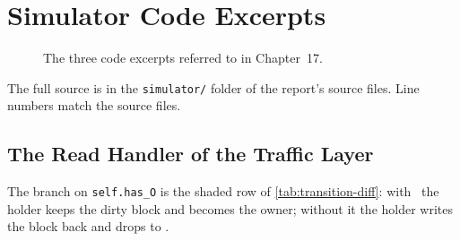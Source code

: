 \chapter{Simulator Code Excerpts}
\label{app:code}

\begin{figure}[htbp]
\centering
{}
\caption[]{The three code excerpts referred to in
Chapter~17.}
\label{fig:app-code-map}
\end{figure}

The full source is in the \texttt{simulator/} folder of the report's source files.
Line numbers match the source files.

\section{The Read Handler of the Traffic Layer}
\label{app:code-read}
%

The branch on \texttt{self.has\_O} is the shaded row of \cref{tab:transition-diff}:
with \stO\ the holder keeps the dirty block and becomes the owner; without it the
holder writes the block back and drops to \stS.


